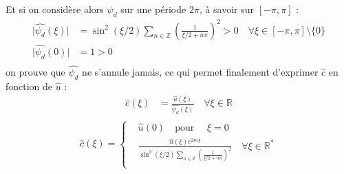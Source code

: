 \documentclass[12pt,a4paper,onecolumn]{article}
\begin{document}
Et si on considère alors \(\widehat{\psi_d}\) sur une période \(2\pi\), à savoir sur \([-\pi, \pi]\) :
\begin{equation*}
	\begin{aligned}
		\lvert\widehat{\psi_d}(\xi)\rvert & = \sin^2(\xi / 2)\sum_{n \in \mathbb{Z}}\left(\frac{1}{\xi / 2 + n\pi}\right)^2 > 0 \quad \forall \xi \in [-\pi, \pi] \setminus \{0\} \\
		\lvert \widehat{\psi_d}(0) \rvert & = 1 > 0                                                                                                                               \\
	\end{aligned}
\end{equation*}
on prouve que \(\widehat{\psi_d}\) ne s'annule jamais, ce qui permet finalement d'exprimer \(\widehat{c}\) en fonction de \(\widehat{u}\) :
\begin{equation*}
	\begin{aligned}
		\widehat{c}(\xi) & = \frac{\widehat{u}(\xi)}{\widehat{\psi_d}(\xi)} \quad \forall \xi \in \mathbb{R} \\
	\end{aligned}
\end{equation*}
\begin{equation*}
	\widehat{c}(\xi) =\left\{
	\begin{aligned}
		 & \widehat{u}(0) \quad \text{pour } \quad \xi = 0                                                                                                          \\
		 & \frac{\widehat{u}(\xi)e^{2i\alpha\xi}}{\sin^2(\xi / 2)\sum_{n \in \mathbb{Z}}\left(\frac{1}{\xi / 2 + n\pi}\right)^2} \quad \forall \xi \in \mathbb{R^*} \\
	\end{aligned}
	\right.
\end{equation*}
\end{document}

